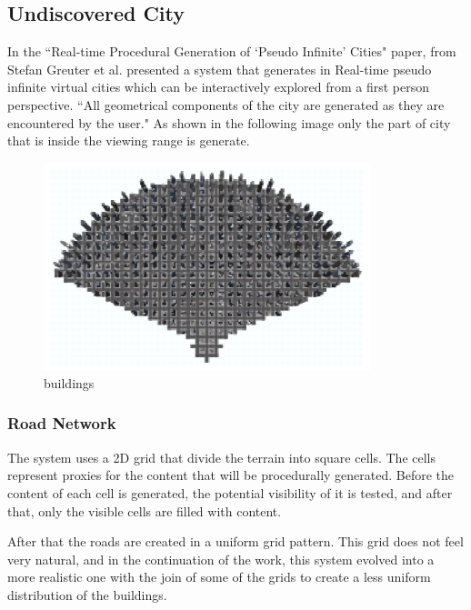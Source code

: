 
\subsection{Undiscovered City} %
\label{sub:undiscovered_city}

In the ``Real-time Procedural Generation of ‘Pseudo Infinite’ Cities" paper, from Stefan Greuter et al. presented a system that generates in Real-time pseudo infinite virtual cities which can be interactively explored from a first person perspective. ``All geometrical components of the city are generated as they are encountered by the user." As shown in the following image only the part of city that is inside the viewing range is generate.

\begin{figure}[htbp]
	\centering
	\includegraphics[width=0.85\textwidth]{img/Real-Time-procedural-generation/viewing-range.png}
	\caption{buildings}
	\label{fig:label}
\end{figure}

\subsubsection{Road Network} %
\label{ssub:road_network}

The system uses a 2D grid that divide the terrain into square cells. The cells represent proxies for the content that will be procedurally generated. Before the content of each cell is generated, the potential visibility of it is tested, and after that, only the visible cells are filled with content.

After that the roads are created in a uniform grid pattern. This grid does not feel very natural, and in the continuation of the work, this system evolved into a more realistic one with the join of some of the grids to create a less uniform distribution of the buildings.

